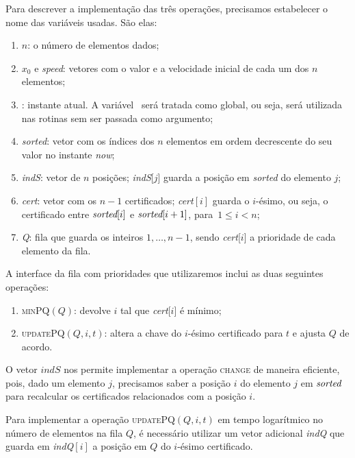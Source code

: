 Para descrever a implementação das três operações, precisamos
estabelecer o nome das variáveis usadas.
São elas:
\begin{enumerate}
    \item $n$: o número de elementos dados;
    \item $x_0$ e \textit{speed}: vetores com o valor e a velocidade
    inicial de cada um dos $n$ elementos;
    \item \now: instante atual.
    A variável \now\ será tratada como
    global, ou seja, será utilizada nas rotinas sem ser passada como
    argumento;
    \item \textit{sorted}: vetor com os índices dos $n$ elementos em
    ordem decrescente do seu valor no instante \textit{now};
    \item \textit{indS}: vetor de $n$ posições; \textit{indS}[$j$]
    guarda a posição em \textit{sorted} do elemento $j$;
    \item \textit{cert}: vetor com os $n-1$ certificados;
    \textit{cert}$[i]$ guarda o $i$-ésimo, ou seja, o certificado
    entre $\textit{sorted}[i]$ e ${\textit{sorted}[i+1]}$, para~$1\leq i < n$;
    \item \textit{Q}: fila que guarda os inteiros $1, \ldots, n-1$,
    sendo \textit{cert}[$i$] a prioridade de cada elemento da fila.
\end{enumerate}

A interface da fila com prioridades que utilizaremos inclui as duas
seguintes operações:
\begin{enumerate}
    \item \textsc{minPQ}$(Q)$: devolve $i$ tal que
    \textit{cert}[$i$] é mínimo;
    \item \textsc{updatePQ}$(Q, i, t)$: altera a chave do
    $i$-ésimo certificado para $t$ e ajusta $Q$ de acordo.
\end{enumerate}

O vetor $\textit{indS}$ nos permite implementar a operação
\textsc{change} de maneira eficiente, pois, dado um elemento $j$,
precisamos saber a posição $i$ do elemento $j$ em $\textit{sorted}$ para
recalcular os certificados relacionados com a posição $i$.

Para implementar a operação \textsc{updatePQ}$(Q, i, t)$ em tempo
logarítmico no número de elementos na fila $Q$, é necessário
utilizar um vetor adicional \textit{indQ} que guarda em
\textit{indQ}$[i]$ a posição em $Q$ do $i$-ésimo certificado.

